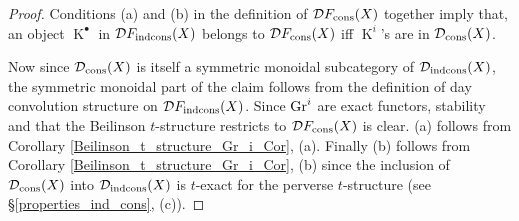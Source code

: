 \documentclass[12pt, reqno]{amsart}
\theoremstyle{plain}
\theoremstyle{definition}
\theoremstyle{definition}
\newcommand{\cD}{{\mathcal D}}
\DeclareMathOperator{\KK}{K}
\begin{document}
\begin{proof}
Conditions (a) and (b) in the definition of $\cD F_{\textup{cons}}(X)$ together imply that,  an object $\KK^{\bullet}$ in $\cD F_{\textup{indcons}}(X)$ belongs to $\cD F_{\textup{cons}}(X)$ iff $\KK^i$'s are in $\cD_{\textup{cons}}(X)$. 

Now since $\cD_{\textup{cons}}(X)$ is itself a symmetric monoidal subcategory of $\cD_{\textup{indcons}}(X)$, the symmetric monoidal part of the claim follows from the definition of day convolution structure \cite[\S 2.23]{GP18} on $\cD F_{\textup{indcons}}(X)$. Since $\textup{Gr}^i$ are exact functors, stability and that the Beilinson $t$-structure restricts to $\cD F_{\textup{cons}}(X)$ is clear. (a) follows from Corollary \ref{Beilinson_t_structure_Gr_i_Cor}, (a). Finally (b) follows from Corollary \ref{Beilinson_t_structure_Gr_i_Cor}, (b) since the inclusion of $\cD_{\textup{cons}}(X)$ into $\cD_{\textup{indcons}}(X)$ is $t$-exact for the perverse $t$-structure (see \S \ref{properties_ind_cons}, (c)). 
\end{proof}



\end{document}

